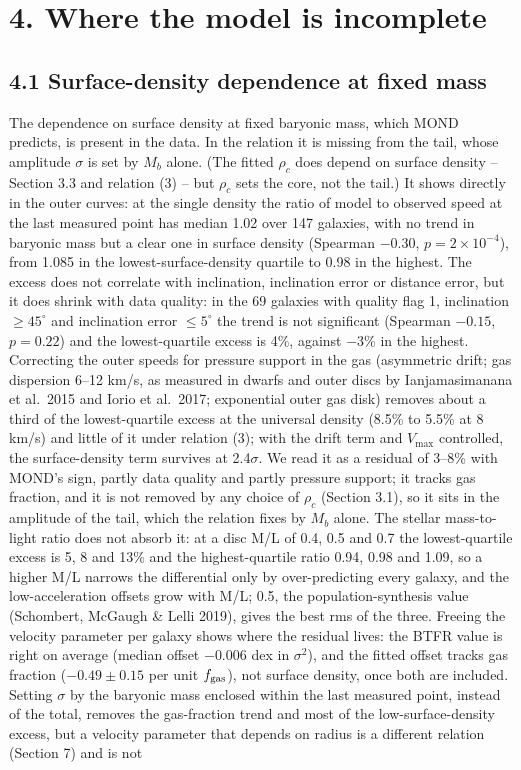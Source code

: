 \documentclass[
  10pt,
]{article}
\begin{document}
\section{4. Where the model is incomplete}\label{where-the-model-is-incomplete}

\subsection{4.1 Surface-density dependence at fixed mass}\label{surface-density-dependence-at-fixed-mass}

The dependence on surface density at fixed baryonic mass, which MOND predicts, is present in the data. In the relation it is missing from the tail, whose amplitude $\sigma$ is set by $M_b$ alone. (The fitted $\rho_c$ does depend on surface density -- Section 3.3 and relation (3) -- but $\rho_c$ sets the core, not the tail.) It shows directly in the outer curves: at the single density the ratio of model to observed speed at the last measured point has median 1.02 over 147 galaxies, with no trend in baryonic mass but a clear one in surface density (Spearman $-0.30$, $p=2\times10^{-4}$), from 1.085 in the lowest-surface-density quartile to 0.98 in the highest. The excess does not correlate with inclination, inclination error or distance error, but it does shrink with data quality: in the 69 galaxies with quality flag 1, inclination $\ge45^\circ$ and inclination error $\le5^\circ$ the trend is not significant (Spearman $-0.15$, $p=0.22$) and the lowest-quartile excess is 4\%, against $-3$\% in the highest. Correcting the outer speeds for pressure support in the gas (asymmetric drift; gas dispersion 6--12 km/s, as measured in dwarfs and outer discs by Ianjamasimanana et al.~2015 and Iorio et al.~2017; exponential outer gas disk) removes about a third of the lowest-quartile excess at the universal density (8.5\% to 5.5\% at 8 km/s) and little of it under relation (3); with the drift term and $V_{\max}$ controlled, the surface-density term survives at 2.4$\sigma$. We read it as a residual of 3--8\% with MOND's sign, partly data quality and partly pressure support; it tracks gas fraction, and it is not removed by any choice of $\rho_c$ (Section 3.1), so it sits in the amplitude of the tail, which the relation fixes by $M_b$ alone. The stellar mass-to-light ratio does not absorb it: at a disc M/L of 0.4, 0.5 and 0.7 the lowest-quartile excess is 5, 8 and 13\% and the highest-quartile ratio 0.94, 0.98 and 1.09, so a higher M/L narrows the differential only by over-predicting every galaxy, and the low-acceleration offsets grow with M/L; 0.5, the population-synthesis value (Schombert, McGaugh \& Lelli 2019), gives the best rms of the three. Freeing the velocity parameter per galaxy shows where the residual lives: the BTFR value is right on average (median offset $-0.006$ dex in $\sigma^2$), and the fitted offset tracks gas fraction ($-0.49\pm0.15$ per unit $f_{\rm gas}$), not surface density, once both are included. Setting $\sigma$ by the baryonic mass enclosed within the last measured point, instead of the total, removes the gas-fraction trend and most of the low-surface-density excess, but a velocity parameter that depends on radius is a different relation (Section 7) and is not 
\end{document}
